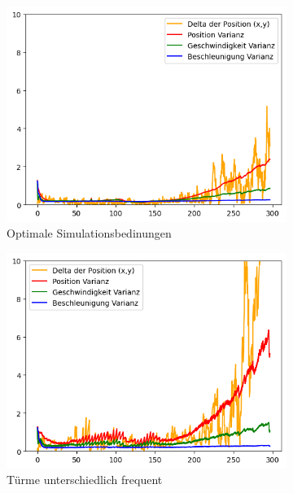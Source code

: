 \begin{figure}
    \begin{subfigure}{.333\textwidth}
        \centering
        \includegraphics[width=.9\linewidth]{Ergebnisse/plots_ungenauigkeiten/winkel/winkel_const_vel_basic.png}  
        \caption{Optimale Simulationsbedinungen}
    \end{subfigure}    
    \begin{subfigure}{.333\textwidth}
        \centering
        \includegraphics[width=.9\linewidth]{Ergebnisse/plots_ungenauigkeiten/winkel/winkel_const_vel_freq.png}  
        \caption{Türme unterschiedlich frequent}
    \end{subfigure}    
    \begin{subfigure}{.333\textwidth}
        \centering

\end{subfigure}
\end{figure}
